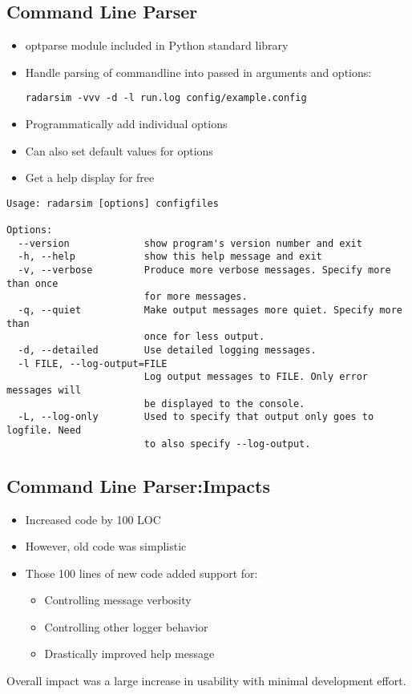 \documentclass[twocolumn]{article}
\begin{document}
\subsection{Command Line Parser}
  \lstset{language=Python}
  \begin{itemize}
    \item optparse module included in Python standard library
    \item Handle parsing of commandline into passed in arguments and options:

    \verb$radarsim -vvv -d -l run.log config/example.config$
    \item Programmatically add individual options
    
    \item Can also set default values for options
    \item Get a help display for free
  \end{itemize}


{\tiny
\begin{verbatim}
Usage: radarsim [options] configfiles

Options:
  --version             show program's version number and exit
  -h, --help            show this help message and exit
  -v, --verbose         Produce more verbose messages. Specify more than once
                        for more messages.
  -q, --quiet           Make output messages more quiet. Specify more than
                        once for less output.
  -d, --detailed        Use detailed logging messages.
  -l FILE, --log-output=FILE
                        Log output messages to FILE. Only error messages will
                        be displayed to the console.
  -L, --log-only        Used to specify that output only goes to logfile. Need
                        to also specify --log-output.
\end{verbatim}}

\subsection{Command Line Parser:Impacts}
  \begin{itemize}
    \item Increased code by 100 LOC
    \item However, old code was simplistic
    \item Those 100 lines of new code added support for:
    \begin{itemize}
      \item Controlling message verbosity
      \item Controlling other logger behavior
      \item Drastically improved help message
    \end{itemize}
  \end{itemize}
  Overall impact was a large increase in usability with minimal development effort.
\end{document}
